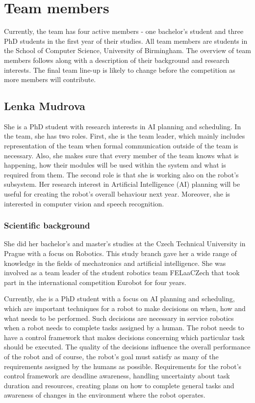 \documentclass[conference]{IEEEtran}
\begin{document}
\section{Team members}
Currently, the team has four active members - one bachelor's student and three PhD students in the first year of their studies. All team members are students in the School of Computer Science, University of Birmingham. The overview of team members follows along with a description of their background and research interests. The final team line-up is likely to change before the competition as more members will contribute.

\subsection{Lenka Mudrova}

She is a PhD student with research interests in AI planning and scheduling. In the team, she has two roles. First, she is the team leader, which mainly includes representation of the team when formal communication outside of the team is necessary. Also, she makes sure that every member of the team knows what is happening, how their modules will be used within the system and what is required from them. The second role is that she is working also on the robot's subsystem. Her research interest in Artificial Intelligence (AI) planning will be useful for creating the robot's overall behaviour next year. Moreover, she is interested in computer vision and speech recognition.

\subsubsection*{Scientific background}
She did her bachelor's and master's studies at the Czech Technical University in Prague with a focus on Robotics. This study branch gave her a wide range of knowledge in the fields of mechatronics and artificial intelligence. She was involved as a team leader of the student robotics team FELaaCZech that took part in the international competition Eurobot for four years. 

Currently, she is a PhD student with a focus on AI planning and scheduling, which are important techniques for a robot to make decisions on when, how and what needs to be performed. Such decisions are necessary in service robotics when a robot needs to complete tasks assigned by a human. The robot needs to have a control framework that makes decisions concerning which particular task should be executed. The quality of the decisions influence the overall performance of the robot and of course, the robot's goal must satisfy as many of the requirements assigned by the humans as possible. Requirements for the robot's control framework are deadline awareness, handling uncertainty about task duration and resources, creating plans on how to complete general tasks and awareness of changes in the environment where the robot operates. 
\end{document}
